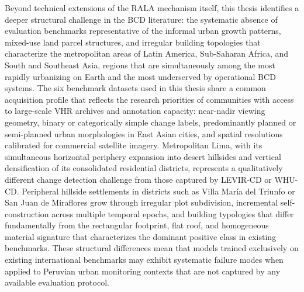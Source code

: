 Beyond technical extensions of the \ac{RALA} mechanism itself, this thesis identifies a deeper structural challenge in the \ac{BCD} literature: the systematic absence of evaluation benchmarks representative of the informal urban growth patterns, mixed-use land parcel structures, and irregular building topologies that characterize the metropolitan areas of Latin America, Sub-Saharan Africa, and South and Southeast Asia, regions that are simultaneously among the most rapidly urbanizing on Earth and the most underserved by operational \ac{BCD} systems. The six benchmark datasets used in this thesis share a common acquisition profile that reflects the research priorities of communities with access to large-scale \ac{VHR} archives and annotation capacity: near-nadir viewing geometry, binary or categorically simple change labels, predominantly planned or semi-planned urban morphologies in East Asian cities, and spatial resolutions calibrated for commercial satellite imagery. Metropolitan Lima, with its simultaneous horizontal periphery expansion into desert hillsides and vertical densification of its consolidated residential districts, represents a qualitatively different change detection challenge from those captured by LEVIR-CD or WHU-CD. Peripheral hillside settlements in districts such as Villa María del Triunfo or San Juan de Miraflores grow through irregular plot subdivision, incremental self-construction across multiple temporal epochs, and building typologies that differ fundamentally from the rectangular footprint, flat roof, and homogeneous material signature that characterizes the dominant positive class in existing benchmarks. These structural differences mean that models trained exclusively on existing international benchmarks may exhibit systematic failure modes when applied to Peruvian urban monitoring contexts that are not captured by any available evaluation protocol.

